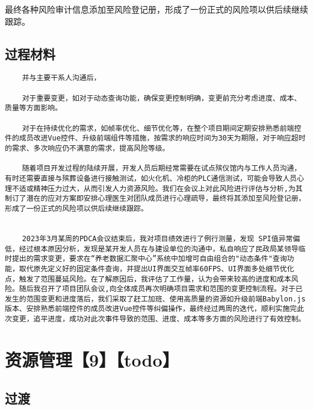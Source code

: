\documentclass[UTF8]{../computerUniverse}
\begin{document}
最终各种风险审计信息添加至风险登记册，形成了一份正式的风险项以供后续继续跟踪。




\section{过程材料}
\begin{lstlisting}
    并与主要干系人沟通后，
    
    对于重要变更，如对于动态查询功能，确保变更控制明确，变更前充分考虑进度、成本、质量等方面影响。

    对于在持续优化的需求，如帧率优化、细节优化等，在整个项目期间定期安排熟悉前端控件的成员改进Vue控件、升级前端组件等措施，按需求的响应时间为30天为期限，对于响应超时的需求、多次响应仍不满意的需求，提高风险等级。

    随着项目开发过程的陆续开展，开发人员后期经常需要在试点殡仪馆内与工作人员沟通，有时还需要直接与殡葬设备进行接触测试，如火化机、冷柜的PLC通信测试，可能会导致人员心理不适或精神压力过大，从而引发人力资源风险。我们在会议上对此风险进行评估与分析,为其制订了潜在的应对方案即安排心理医生对团队成员进行心理疏导，最终将其添加至风险登记册，形成了一份正式的风险项以供后续继续跟踪。
    
    
    2023年3月某周的PDCA会议结束后，我对项目绩效进行了例行测量，发现 SPI值异常偏低，经过根本原因分析，发现是某开发人员在与建设单位的沟通中，私自响应了民政局某领导临时提出的需求变更，要求在“养老数据汇聚中心”系统中加增可自由组合的"动态条件"查询功能，取代原先定义好的固定条件查询，并提出UI界面交互帧率60FPS、UI界面多处细节优化点，触发了范围蔓延风险。在了解原因后，我评估了工作量，认为会带来较高的进度和成本风险。随后我召开了项目团队会议,向全体成员再次明确项目需求和范围的变更控制流程。对于已发生的范围变更和进度落后，我们采取了赶工加班、使用高质量的资源如升级前端Babylon.js版本、安排熟悉前端控件的成员改进Vue控件等纠偏操作，最终经过两周的迭代，顺利实施完此次变更，追平进度，成功对此次事件导致的范围、进度、成本等多方面的风险进行了有效控制。

\end{lstlisting}

\chapter{资源管理【9】【todo】}


\section{过渡}
\end{document}

